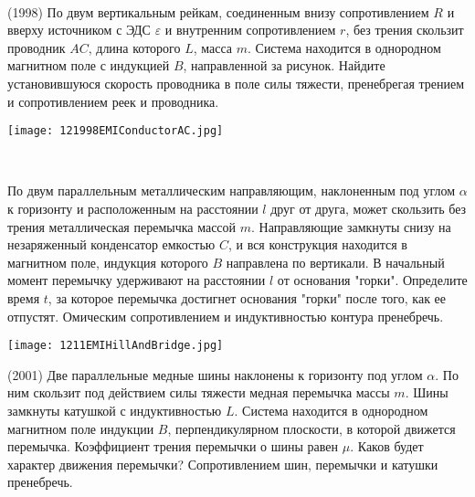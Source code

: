 \begin{ex}
\hspace{0pt} \\
\begin{minipage}{.65\textwidth}
(1998) По двум вертикальным рейкам, соединенным внизу сопротивлением $R$ и вверху источником с ЭДС {\Large $\varepsilon$} и внутренним сопротивлением $r$, без трения скользит проводник $AC$, длина которого $L$, масса $m$. 
Система находится в однородном магнитном поле с индукцией $B$, направленной за рисунок. 
Найдите установившуюся скорость проводника в поле силы тяжести, пренебрегая трением и сопротивлением реек и проводника.
\end{minipage}
\begin{minipage}{.35\textwidth}
\centering
\texttt{[image: 121998EMIConductorAC.jpg]}
\end{minipage}
\begin{ans}
\end{ans}
\end{ex}

\begin{ex}
\hspace{0pt} \\
\begin{minipage}{.65\textwidth}
По двум параллельным металлическим направляющим, наклоненным под углом $\alpha$ к горизонту и 
расположенным на расстоянии $l$ друг от друга, может скользить без трения металлическая перемычка массой $m$. 
Направляющие замкнуты снизу на незаряженный конденсатор емкостью $C$, и вся конструкция находится в магнитном поле, индукция которого $B$ направлена по вертикали. В начальный момент перемычку удерживают на расстоянии $l$ от основания "горки". 
Определите время $t$, за которое перемычка достигнет основания "горки" после того, как ее отпустят. 
Омическим сопротивлением и индуктивностью контура пренебречь.
\end{minipage}
\begin{minipage}{.35\textwidth}
\centering
\texttt{[image: 1211EMIHillAndBridge.jpg]}
\end{minipage}
\begin{ans}
\end{ans}
\end{ex}

\begin{ex}
(2001) Две параллельные медные шины наклонены к горизонту под углом  $\alpha$. 
По ним скользит под действием силы тяжести медная перемычка массы $m$. Шины замкнуты катушкой с индуктивностью $L$. 
Система находится в однородном магнитном поле индукции $B$, перпендикулярном плоскости, в которой движется перемычка. 
Коэффициент трения перемычки о шины равен $\mu$. Каков будет характер движения перемычки? Сопротивлением шин, перемычки и катушки пренебречь.
\begin{ans}
\end{ans}
\end{ex}

